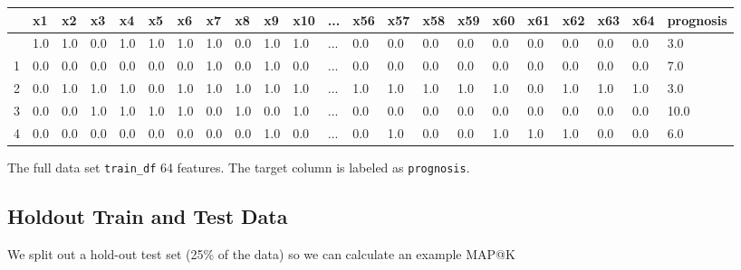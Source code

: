 \documentclass[
  letterpaper,
  DIV=11,
  numbers=noendperiod]{scrreprt}
\begin{document}
\begin{longtable}[]{@{}llllllllllllllllllllll@{}}
\toprule\noalign{}
& x1 & x2 & x3 & x4 & x5 & x6 & x7 & x8 & x9 & x10 & ... & x56 & x57 &
x58 & x59 & x60 & x61 & x62 & x63 & x64 & prognosis \\
\midrule\noalign{}
\endhead
\bottomrule\noalign{}
\endlastfoot
0 & 1.0 & 1.0 & 0.0 & 1.0 & 1.0 & 1.0 & 1.0 & 0.0 & 1.0 & 1.0 & ... &
0.0 & 0.0 & 0.0 & 0.0 & 0.0 & 0.0 & 0.0 & 0.0 & 0.0 & 3.0 \\
1 & 0.0 & 0.0 & 0.0 & 0.0 & 0.0 & 0.0 & 1.0 & 0.0 & 1.0 & 0.0 & ... &
0.0 & 0.0 & 0.0 & 0.0 & 0.0 & 0.0 & 0.0 & 0.0 & 0.0 & 7.0 \\
2 & 0.0 & 1.0 & 1.0 & 1.0 & 0.0 & 1.0 & 1.0 & 1.0 & 1.0 & 1.0 & ... &
1.0 & 1.0 & 1.0 & 1.0 & 1.0 & 0.0 & 1.0 & 1.0 & 1.0 & 3.0 \\
3 & 0.0 & 0.0 & 1.0 & 1.0 & 1.0 & 1.0 & 0.0 & 1.0 & 0.0 & 1.0 & ... &
0.0 & 0.0 & 0.0 & 0.0 & 0.0 & 0.0 & 0.0 & 0.0 & 0.0 & 10.0 \\
4 & 0.0 & 0.0 & 0.0 & 0.0 & 0.0 & 0.0 & 0.0 & 0.0 & 1.0 & 0.0 & ... &
0.0 & 1.0 & 0.0 & 0.0 & 1.0 & 1.0 & 1.0 & 0.0 & 0.0 & 6.0 \\
\end{longtable}

The full data set \texttt{train\_df} 64 features. The target column is
labeled as \texttt{prognosis}.

\hypertarget{holdout-train-and-test-data-2}{%
\subsection{Holdout Train and Test
Data}\label{holdout-train-and-test-data-2}}

We split out a hold-out test set (25\% of the data) so we can calculate
an example MAP@K
\end{document}
